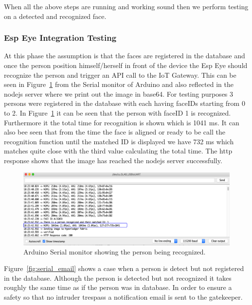 When all the above steps are running and working sound then we perform testing on a detected and recognized face. 

\subsubsection{Esp Eye Integration Testing}

At this phase the assumption is that the faces are registered in the database and once the person position himself/herself in front of the device the Esp Eye should recognize the person and trigger an API call to the IoT Gateway. This can be seen in Figure~\ref{fig:serial_monitor} from the Serial monitor of Arduino and also reflected in the nodejs server where we print out the image in base64.  For testing purposes 3 persons were registered in the database with each having faceIDs starting from 0 to 2. In Figure~\ref{fig:serial_monitor} it can be seen that the person with faceID 1 is recognized. Furthermore it the total time for recognition is shown which is 1041 ms. It can also bee seen that from the time the face is aligned or ready to be call the recognition function until the matched ID is displayed we have 732 ms which matches quite close with the third value calculating the total time. The http response shows that the image has reached the nodejs server successfully. 



\begin{figure}[!htb]
    \centering
    \includegraphics[width=1\textwidth]{figures/serialport1_highlight.png}
    \caption{Arduino Serial monitor showing the person being recognized.}
    \label{fig:serial_monitor}
\end{figure}

Figure~\ref{fig:serial_email} shows a case when a person is detect but not registered in the database. Although the person is detected but not recognized it takes roughly the same time as if the person was in database. In order to ensure a safety so that no intruder trespass a notification email is sent to the gatekeeper. 

